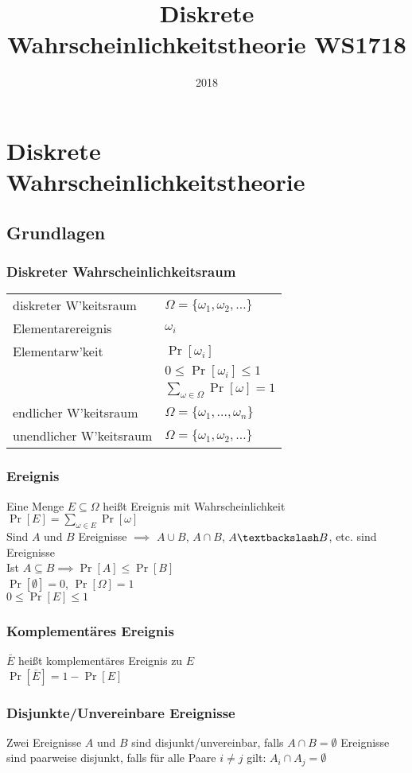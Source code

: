 \documentclass[a4paper,9pt]{extarticle}
\title{Diskrete Wahrscheinlichkeitstheorie WS1718}
\author{}
\date{2018}
\begin{document}
\section*{Diskrete Wahrscheinlichkeitstheorie}
\subsection*{Grundlagen}
\subsubsection*{Diskreter Wahrscheinlichkeitsraum}
\begin{tabular}{ll}
	diskreter W'keitsraum & $\Omega = \{\omega_1, \omega_2, \dots\}$ \\
	Elementarereignis & $\omega_i$ \\
	Elementarw'keit & $\Pr[\omega_i]$ \\
	& $0 ≤ \Pr[\omega_i] ≤ 1$ \\
	& $\sum_{\omega \in \Omega} \Pr[\omega] = 1$ \\
	endlicher W'keitsraum & $\Omega = \{\omega_1, \dots, \omega_n\}$ \\
	unendlicher W'keitsraum & $\Omega = \{\omega_1, \omega_2, \dots\}$
\end{tabular}

\subsubsection*{Ereignis}
Eine Menge $E \subseteq \Omega$ heißt Ereignis mit Wahrscheinlichkeit \\
$\Pr[E] = \sum_{\omega \in E} \Pr[\omega]$ \\

Sind $A$ und $B$ Ereignisse $\implies$ $A \cup B$, $A \cap B$, $A \textbackslash B$, etc. sind Ereignisse \\
Ist $A \subseteq B \implies \Pr[A] ≤ \Pr[B]$ \\
$\Pr[∅] = 0$, $\Pr[\Omega] = 1$ \\
$0 ≤ \Pr[E] ≤ 1$

\subsubsection*{Komplementäres Ereignis}
$\bar{E}$ heißt komplementäres Ereignis zu $E$ \\
$\Pr[\bar{E}] = 1 - \Pr[E]$

\subsubsection*{Disjunkte/Unvereinbare Ereignisse}
Zwei Ereignisse $A$ und $B$ sind disjunkt/unvereinbar, falls $A \cap B = ∅$
Ereignisse sind paarweise disjunkt, falls für alle Paare $i ≠ j$ gilt: $A_i \cap A_j = ∅$
\end{document}
